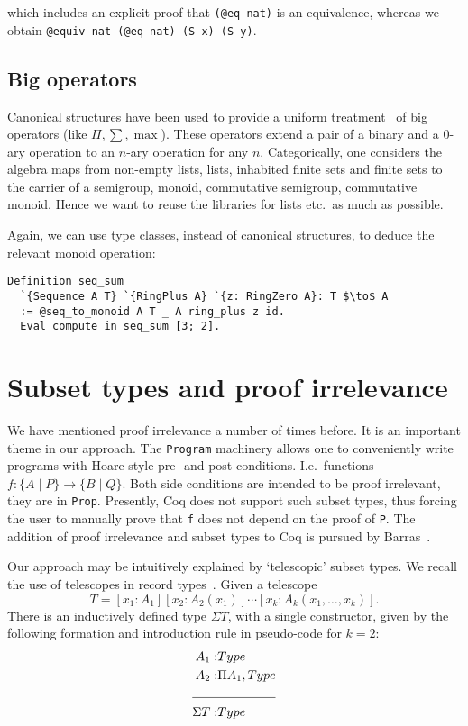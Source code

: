 \documentclass[a4paper,10pt,runningheads]{llncs}
\begin{document}
which includes an explicit proof that \lstinline|(@eq nat)| is an equivalence,
whereas we obtain \lstinline|@equiv nat (@eq nat) (S x) (S y)|.

\subsection{Big operators}
Canonical structures have been used to provide a uniform treatment~\cite{bertot2008canonical} of big
operators (like $\Pi,\sum, \max$). These operators extend a pair of a binary and a 0-ary operation
to an $n$-ary operation for any $n$. Categorically, one considers the algebra maps from non-empty
lists, lists, inhabited finite sets and finite sets to the carrier of a semigroup, monoid,
commutative semigroup, commutative monoid. Hence we want to reuse the libraries for lists etc.\ as much as possible.

Again, we can use type classes, instead of canonical structures, to deduce the relevant monoid operation:
\begin{lstlisting}
Definition seq_sum
  `{Sequence A T} `{RingPlus A} `{z: RingZero A}: T $\to$ A
  := @seq_to_monoid A T _ A ring_plus z id.
  Eval compute in seq_sum [3; 2].
\end{lstlisting}

\section{Subset types and proof irrelevance}\label{PI}
We have mentioned proof irrelevance a number of times before. It is an important theme in our
approach. The \lstinline|Program| machinery allows one to conveniently write programs with Hoare-style
pre- and post-conditions. I.e.\ functions $f: \{ A \mid P \} \to \{ B \mid Q \}$. Both side
conditions
are intended to be proof irrelevant, they are in \lstinline|Prop|. Presently, Coq does not support such subset
types, thus forcing the user to manually prove that \lstinline|f| does not depend on the proof of \lstinline|P|.
The addition of proof irrelevance and subset types to Coq is pursued by
Barras~\cite{Barras:subset,Werner08}. 

Our approach may be intuitively explained by `telescopic' subset types. We recall the use of telescopes in record types~\cite{pollack2000dependently}. Given a telescope\[
T=[x_1:A_1][x_2:A_2(x_1)]\cdots[x_k:A_k(x_1,\ldots,x_k)].
\]
There is an inductively defined type $\Sigma T$, with a single constructor, given by the following 
formation and introduction rule in pseudo-code for $k=2$:
\begin{align*}
 A_1 :& Type\\
 A_2 :& \Pi A_1,Type\\
\cline{1-2}
\Sigma T :& Type
\end{align*}
\end{document}
